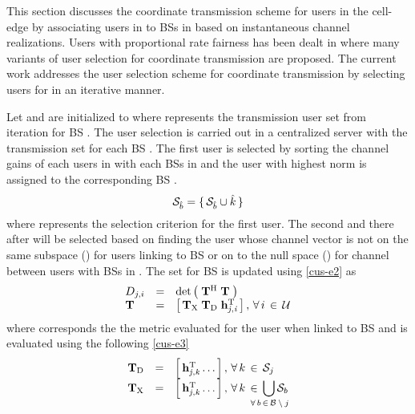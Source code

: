 
This section discusses the coordinate transmission scheme for users in the cell-edge by associating users in  to BSs in  based on instantaneous channel realizations. Users with proportional rate fairness has been dealt in \cite{antti_coord_user_selection} where many variants of user selection for coordinate transmission are proposed. The current work addresses the user selection scheme for coordinate transmission by selecting users for  in an iterative manner.

Let  and  are initialized to  where  represents the transmission user set from  iteration for BS . The user selection is carried out in a centralized server with the transmission set  for each BS . The first user is selected by sorting the channel gains of each users in  with each BSs in  and the user  with highest norm is assigned to the corresponding BS .
\begin{equation}
\mathcal{S}_{\hat{b}} = \lbrace \, \mathcal{S}_{\hat{b}} \cup \hat{k} \, \rbrace
\label{cus-e1}
\end{equation}
where  represents the selection criterion for the first user. The second and there after will be selected based on finding the user whose channel vector is not on the same subspace () for users linking to BS  or on to the null space () for channel between users with BSs in . The set  for BS  is updated using \eqref{cus-e2} as
\begin{equation}
\begin{array}{lcl}
D_{j,i} &=& \det \left ( \; \mathbf{T}^{\mathrm{H}} \; \mathbf{T} \; \right ) \\
\mathbf{T} &=& \left [ \, \mathbf{T}_{\mathrm{X}} \; \mathbf{T}_{\mathrm{D}} \; \mathbf{h}_{\mathit{j},\mathit{i}}^{\mathrm{T}} \, \right ], \, \forall \, i \, \in \, \mathcal{U}
\end{array}
\label{cus-e2}
\end{equation}
where  corresponds the the metric evaluated for the user  when linked to BS  and  is evaluated using the following \eqref{cus-e3}
\begin{equation}
\begin{array}{lcl}
\mbf{T}_{\mrm{D}} &=& \matscont{\mvecxyz{h}{j}{k}^\mrm{T} \dotso}, \fall k \inm \mc{S}_j \\
\mbf{T}_{\mrm{X}} &=& \matscont{\mvecxyz{h}{j}{k}^\mrm{T} \dotso }, \fall k \inm \displaystyle \bigcup_{\mathclap{\fall b \inm \mc{B} \bs j}} \mc{S}_b
\end{array}
\label{cus-e3}
\end{equation}
